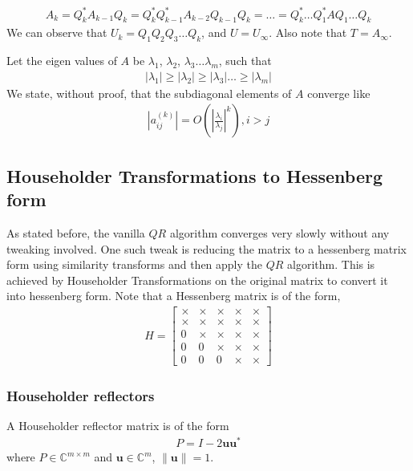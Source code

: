 \documentclass[12pt]{article}
\numberwithin{equation}{section}
\newcommand{\vecb}[1]{\mathbf{#1}}
\newcommand{\brak}[1]{\ensuremath{\left(#1\right)}}
\newcommand{\defmat}[2]{#1\in\mathbb{C}^{#2\times#2}}
\newcommand{\defvec}[2]{\vecb{#1}\in\mathbb{C}^{#2}}
\newcommand{\abs}[1]{\left\vert#1\right\vert}
\newcommand{\norm}[1]{\left\lVert#1\right\rVert}
\begin{document}
\begin{align}
    A_k = Q_k^{\ast} A_{k - 1} Q_k = Q_k^{\ast} Q_{k - 1}^{\ast} A_{k - 2} Q_{k - 1} Q_k = \dots = Q_k^{\ast}\dots Q_1^{\ast} A Q_1 \dots Q_k
\end{align}
We can observe that $U_k = Q_1 Q_2 Q_3 \dots Q_k$, and $U = U_{\infty}$.
Also note that $T = A_{\infty}$.

Let the eigen values of $A$ be $\lambda_1$, $\lambda_2$, $\lambda_3 \dots \lambda_m$, such that
\begin{align}
    \abs{\lambda_1} \geq \abs{\lambda_2} \geq \abs{\lambda_3} \dots \geq \abs{\lambda_m}
\end{align}
We state, without proof, that the subdiagonal elements of $A$ converge like
\begin{align}
    \abs{a_{ij}^{\brak{k}}} = O\brak{\abs{\frac{\lambda_i}{\lambda_j}}^k}, i > j
\end{align}

\subsection{Householder Transformations to Hessenberg form}
As stated before, the vanilla $QR$ algorithm converges very slowly without any tweaking involved.
One such tweak is reducing the matrix to a hessenberg matrix form using similarity transforms and then apply the $QR$ algorithm. 
This is achieved by Householder Transformations on the original matrix to convert it into hessenberg form.
\newline
Note that a Hessenberg matrix is of the form,
\begin{align}
H = \begin{bmatrix}
\times & \times & \times & \times & \times\\
\times & \times & \times & \times & \times\\
0 & \times & \times & \times & \times\\
0 & 0 & \times & \times & \times\\
0 & 0 & 0 & \times & \times
\end{bmatrix}   
\end{align}
\subsubsection{Householder reflectors}
A Householder reflector matrix is of the form
\begin{align}
    P = I - 2\vecb{u}\vecb{u}^{\ast}
\end{align}
where $\defmat{P}{m}$ and $\defvec{u}{m}$, $\norm{\vecb{u}} = 1$.
\end{document}
